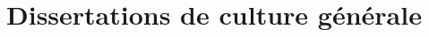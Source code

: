 \documentclass[openany, oneside, a4paper, 12pt]{book}
\begin{document}
\chapter{Dissertations de culture générale}
%
%
%
%
%
%
%
%
%
%
%
%
%
%
%
\end{document}
